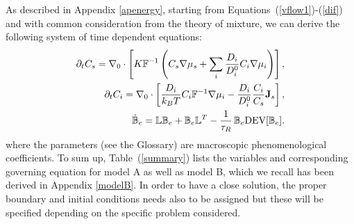 As described in Appendix \ref{apenergy}, starting from Equations~(\ref{vflow1})-(\ref{dif}) and with common consideration from the theory of mixture, we can derive the following system of time dependent equations:
\begin{eqnarray}
\partial_t C_s=\nabla_0 \cdot\left[K \mathbb{F}^{-1}\left(C_s\nabla \mu_s +\sum_i \frac{D_i}{D^0_i} C_i \nabla \mu_i\right)\right],\label{gov2}\\
\partial_t C_i= \nabla_0\cdot\left[\frac{D_i}{k_B T}C_i\mathbb{F}^{-1}\nabla \mu_i -\frac{D_i}{D^0_i} \frac{C_i}{C_s} \mathbf{J}_s\right],\label{gov3} \\
\dot{\mathbb{B}}_e =\mathbb{L}\mathbb{B}_e + \mathbb{B}_e \mathbb{L}^T - \frac{1}{\tau_R} \,\mathbb{B}_e\text{DEV}[\mathbb{B}_e].\label{Be}
\end{eqnarray}
where the parameters (see the Glossary) are macroscopic phenomenological coefficients. To sum up, Table~(\ref{summary}) lists the variables and corresponding governing equation for model A as well as model B, which we recall has been derived in Appendix \ref{modelB}. In order to have a close solution, the proper boundary and initial conditions needs also to be assigned but these will be specified depending on the specific problem considered.

